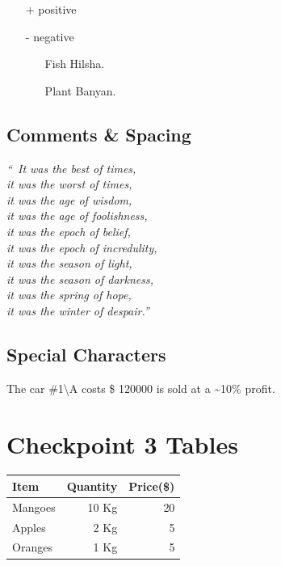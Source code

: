 \documentclass[a4paper,12pt]{article}
\begin{document}
\begin{itemize}
    \item[+] positive
    \item[-] negative
    \begin{itemize}
        \item[Fish] Hilsha.
        \item[Plant] Banyan.
    \end{itemize}
\end{itemize}

\subsection{Comments & Spacing}
\vspace{12pt}
\textsl{“\ It was the best of times,\\it was the worst of times,\\ it was the age of wisdom,\\it was the age of foolishness,\\ it was the epoch of belief,\\ it was the epoch of incredulity,\\it was the season of light,\\ it was the season of darkness,\\ it was the spring of hope,\\ it was the winter of despair.”}

\subsection{Special Characters}
\vspace{12pt}

The car \#1\textbackslash A costs \$ 120000 is sold at
a \~{}10\% profit.

\newpage

\section{Checkpoint 3 Tables}
\vspace{12pt}


\begin{tabular}{l|r|r}
     Item&Quantity&Price(\$) \\
     \hline
     Mangoes&10 Kg&20\\
     Apples&2 Kg&5\\
     Oranges& 1 Kg &5\\
\end{tabular}
\end{document}
